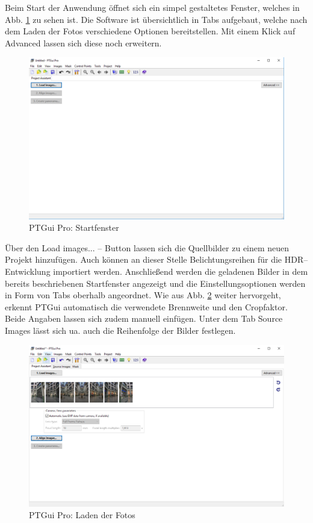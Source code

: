 \documentclass[liststotoc,bibtotoc,fontsize=14pt,]{scrreprt}
\begin{document}
	Beim Start der Anwendung öffnet sich ein simpel gestaltetes Fenster, welches in Abb. \ref{img:ptgui_step_1} zu sehen ist. Die Software ist übersichtlich in Tabs aufgebaut, welche nach dem Laden der Fotos verschiedene Optionen bereitstellen. Mit einem Klick auf \grqq{}Advanced\grqq{} lassen sich diese noch erweitern.
	\begin{figure}[H]
		\includegraphics[width=\linewidth]{img/steps/PTGui_Step_1.PNG}
		\caption{PTGui Pro: Startfenster}
		\label{img:ptgui_step_1}
	\end{figure}
	\bigskip
	Über den \grqq{}Load images... -- Button\grqq{} lassen sich die Quellbilder zu einem neuen Projekt hinzufügen. Auch können an dieser Stelle Belichtungsreihen für die HDR--Entwicklung importiert werden. Anschließend werden die geladenen Bilder in dem bereits beschriebenen Startfenster angezeigt und die Einstellungsoptionen werden in Form von Tabs oberhalb angeordnet. Wie aus Abb. \ref{img:ptgui_step_2} weiter hervorgeht, erkennt PTGui automatisch die verwendete Brennweite und den Cropfaktor. Beide Angaben lassen sich zudem manuell einfügen. Unter dem Tab \grqq{}Source Images\grqq{} lässt sich ua. auch die Reihenfolge der Bilder festlegen.
	\begin{figure}[H]
		\includegraphics[width=\linewidth]{img/steps/PTGui_Step_2.PNG}
		\caption{PTGui Pro: Laden der Fotos}
		\label{img:ptgui_step_2}
	\end{figure}
\end{document}
